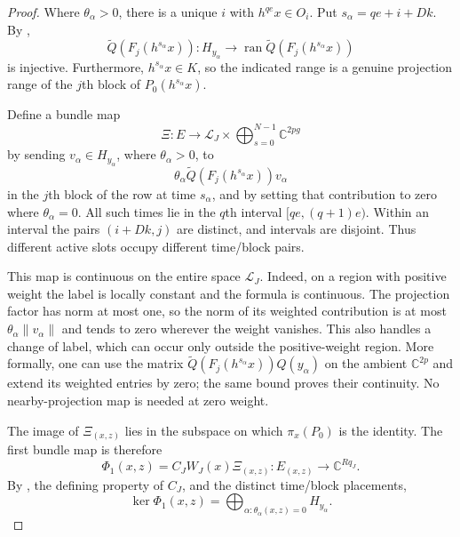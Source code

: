 \begin{proof}
Where $\theta_\alpha>0$, there is a unique $i$ with $h^{qe}x\in O_i$.
Put $s_\alpha=qe+i+Dk$.  By
,
\[
 \widetilde Q(F_j(h^{s_\alpha}x)):
 H_{y_\alpha}\longrightarrow
        \operatorname{ran}\widetilde Q(F_j(h^{s_\alpha}x))
\]
is injective.  Furthermore, $h^{s_\alpha}x\in K$, so the indicated
range is a genuine projection range of the $j$th block of
$P_0(h^{s_\alpha}x)$.

Define a bundle map
\[
 \Xi:E\longrightarrow
      \mathcal L_J\times\bigoplus_{s=0}^{N-1}\mathbb C^{2pg}
\]
by sending $v_\alpha\in H_{y_\alpha}$, where
$\theta_\alpha>0$, to
\[
 \theta_\alpha\widetilde Q(F_j(h^{s_\alpha}x))v_\alpha
\]
in the $j$th block of the row at time $s_\alpha$, and by setting that
contribution to zero where $\theta_\alpha=0$.
All such times lie in the $q$th interval $[qe,(q+1)e)$.
Within an interval the pairs $(i+Dk,j)$ are distinct, and intervals
are disjoint.  Thus different active slots occupy different
time/block pairs.

This map is continuous on the entire space $\mathcal L_J$.
Indeed, on a region with positive weight the label is locally constant
and the formula is continuous.  The projection factor has norm at most
one, so the norm of its weighted contribution is at most
$\theta_\alpha\|v_\alpha\|$ and tends to zero wherever the weight
vanishes.  This also handles a change of label, which can occur only
outside the positive-weight region.  More formally, one can use the
matrix $\widetilde Q(F_j(h^{s_\alpha}x))Q(y_\alpha)$ on the ambient
$\mathbb C^{2p}$ and extend its weighted entries by zero; the same
bound proves their continuity.  No nearby-projection map is needed at
zero weight.

The image of $\Xi_{(x,z)}$ lies in the subspace on which
$\pi_x(P_0)$ is the identity.  The first bundle map is therefore
\[
 \Phi_1(x,z)=C_JW_J(x)\Xi_{(x,z)}:
 E_{(x,z)}\longrightarrow\mathbb C^{Rq_J}.
\]
By , the defining property of
$C_J$, and the distinct time/block placements,
\begin{equation}
\label{eq:first-map-kernel}
 \ker\Phi_1(x,z)=
       \bigoplus_{\alpha:\theta_\alpha(x,z)=0} H_{y_\alpha}.
\end{equation}


\end{proof}
